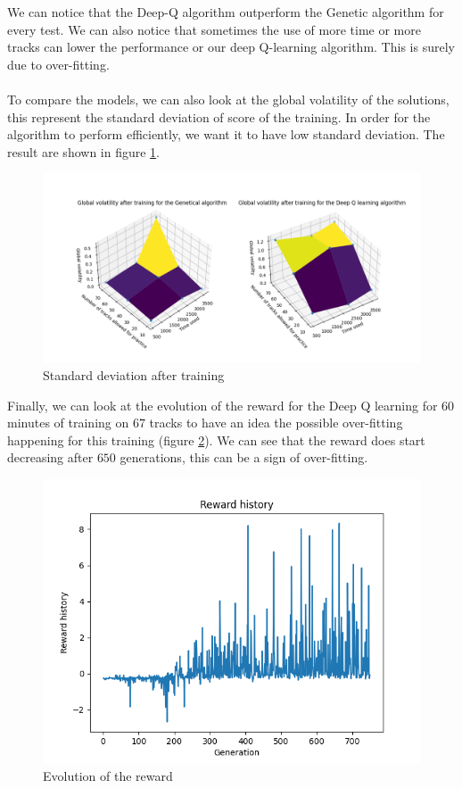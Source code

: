 \documentclass[11pt,a4paper]{article}
\newcounter{fig}
\begin{document}
We can notice that the Deep-Q algorithm outperform the Genetic algorithm for every test. We can also notice that sometimes the use of more time or more tracks can lower the performance or our deep Q-learning algorithm. This is surely due to over-fitting.\\
\\
To compare the models, we can also look at the global volatility of the solutions, this represent the standard deviation of score of the training. In order for the algorithm to perform efficiently, we want it to have low standard deviation. The result are shown in figure \ref{figure:standard deviation}.
        \begin{figure}[ht]
            \centering
            \includegraphics[scale = 0.55]{comparaison3.png}
            \caption{Standard deviation after training}
            \label{figure:standard deviation}
        \end{figure}
 
\newpage
Finally, we can look at the evolution of the reward for the Deep Q learning for $60$ minutes of training on $67$ tracks to have an idea the possible over-fitting happening for this training (figure \ref{figure:evolution of the reward}). We can see that the reward does start decreasing after $650$ generations, this can be a sign of over-fitting.
        \begin{figure}[ht]
            \centering
            \includegraphics[width=0.5\linewidth]{graphe_reward.png}
            \caption{Evolution of the reward}
            \label{figure:evolution of the reward}
        \end{figure}
        
\end{document}
